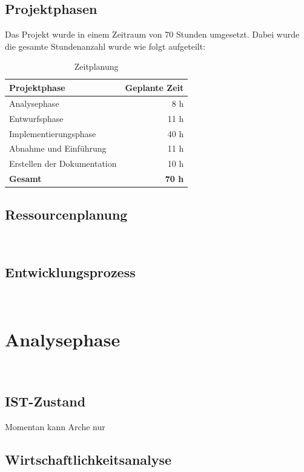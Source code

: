 \documentclass[11pt,toc=sectionentrywithoutdots, 
headheight=44pt, headings=optiontoheadandtoc, hyperfootnotes=false]{scrartcl}
\begin{document}
\subsection{Projektphasen}
Das Projekt wurde in einem Zeitraum von 70 Stunden umgesetzt. 
Dabei wurde die gesamte Stundenanzahl wurde wie folgt aufgeteilt:


\begin{table}[ht]
	\begin{center}
		\begin{tabular}{ ||l|r|| }
			\hline
			\textbf{Projektphase} 		& \textbf{Geplante Zeit} \\
			\hline

			Analysephase 				& 8 h	 		\\
			Entwurfsphase				& 11 h	 		\\
			Implementierungsphase 		& 40 h	 		\\
			Abnahme und Einführung		& 11 h 			\\
			Erstellen der Dokumentation & 10 h 			\\
			\hline
			\textbf{Gesamt}	 			& \textbf{70 h}	\\
			
			\hline
		\end{tabular}
		\caption{Zeitplanung}
	\end{center}
\end{table}	


\subsection{Ressourcenplanung}
\blindtext\

\subsection{Entwicklungsprozess}
\blindtext\

\section{Analysephase}
\blindtext\

\subsection{IST-Zustand}
Momentan kann Arche nur

\subsection{Wirtschaftlichkeitsanalyse}
\blindtext\
\end{document}
